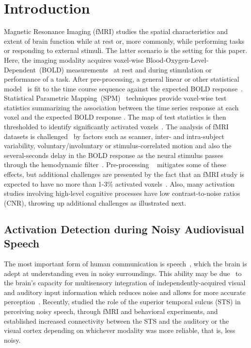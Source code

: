 \section{Introduction}\label{sintro}

 Magnetic Resonance Imaging (fMRI)
\citep{belliveauetal91,kwongetal92,bandettinietal93,fristonetal95,howsemanandbowtell98,pennyetal06,lindquist08,lazar08,ashby11}
studies the spatial characteristics and extent of brain
function while at rest or, more commonly, while performing tasks or 
responding to external stimuli. The latter scenario is the
setting for this paper. Here, the imaging modality acquires voxel-wise Blood-Oxygen-Level-Dependent~(BOLD)  
measurements~\citep{ogawaetal90a,ogawaetal90b} at rest and during
stimulation or performance of a task. After pre-processing, a general
linear or other statistical model~\citep{fristonetal95,worsleyetal02} is fit to
the time course sequence against the expected BOLD 
response~\citep{fristonetal98,glover99,buxtonetal04}. Statistical
Parametric Mapping~(SPM)~\citep{fristonetal90} techniques provide
voxel-wise test statistics summarizing the association between the time
series response at each voxel and the expected BOLD  response
\citep{bandettinietal93}.  
The map of test statistics is then thresholded to identify  significantly 
activated voxels~\citep{friston1994statistical,worsley1995analysis,genoveseetal02}.   The analysis of fMRI datasets is
challenged~\citep{hajnaletal94,biswaletal96,woodetal98,gullapallietal05}
by factors such as scanner, inter- and intra-subject variability,
voluntary/involuntary or stimulus-correlated motion and also the
several-seconds delay in the BOLD response as the  neural
stimulus passes through the hemodynamic
filter~\citep{maitraetal02,gullapallietal05,maitra09b}. Pre-processing 
~\citep{woodetal98,saadetal09} mitigates some of these effects,
but additional challenges are presented by the fact that an fMRI study
is expected to have no more than 1-3\% activated voxels~\citep{chenandsmall07,lazar08}. Also, many activation 
studies involving  high-level cognitive processes have low
contrast-to-noise ratios (CNR), throwing up additional challenges as illustrated next.

\subsection{Activation Detection during Noisy Audiovisual Speech}
\label{intro:av} 
The most important %
form of human communication is
speech~\citep{kryter94,hauser96,dupontandluettin00}, 
which the brain is  adept at understanding even in noisy
surroundings. This ability may be due~\citep{nathandbeauchamp11}
to the brain's capacity  for  
multisensory integration of independently-acquired visual and auditory
input information which reduces noise and allows for more accurate
perception~\citep{sumbyandpollack54,steinandmeredith93}. Recently,
\citet{nathandbeauchamp11} studied the role of the superior 
temporal sulcus (STS) in  perceiving noisy speech, through fMRI
and behavioral experiments, and established increased connectivity
between the STS and the auditory or the visual cortex depending on
whichever modality was more reliable, that is,
less noisy.

